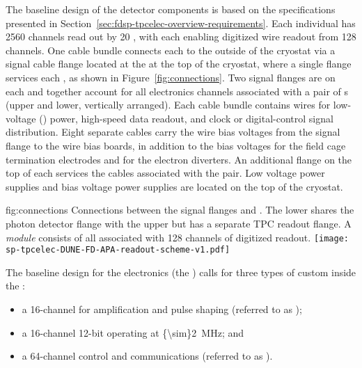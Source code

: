 The baseline design of the  detector components is
based on the specifications %
presented in%
Section~\ref{sec:fdsp-tpcelec-overview-requirements}. 
Each individual  has \num{2560} channels read out by \num{20} 
, with each  enabling digitized wire readout 
from \num{128} channels. One cable bundle connects each  to
the outside of the cryostat via a  signal cable flange located 
at the  \fdth at the top of the cryostat, where a single flange 
services each , as shown in Figure~\ref{fig:connections}. 
Two  signal flanges are on each \fdth and together account for 
all electronics channels associated with a pair of s (upper 
and lower, vertically arranged). Each cable bundle contains wires for 
low-voltage () power, high-speed data readout, and clock or 
digital-control signal distribution. Eight separate cables carry the 
 wire bias voltages from the signal flange to the  
wire bias boards, in addition to the bias voltages for the field cage 
termination electrodes and for the electron diverters. An additional 
flange on the top of each \fdth services the  cables associated 
with the  pair. Low voltage power supplies and bias voltage
power supplies are located on the top of the cryostat. 

\begin{dunefigure}
{fig:connections}
{Connections between the signal flanges and . The lower 
 shares the photon detector flange with the 
upper  but has a separate TPC readout flange. 
A \textit{ module} consists of all  
associated with \num{128} channels of digitized readout.}
\texttt{[image: sp-tpcelec-DUNE-FD-APA-readout-scheme-v1.pdf]}
\end{dunefigure}

The baseline design for the   electronics (the ) calls for three 
types of custom  inside  the :
\begin{itemize}
\item{a \num{16}-channel   for amplification 
and pulse shaping (referred to as );}
\item{a \num{16}-channel \num{12}-bit   
operating at \SI{{\sim}2}{MHz}; and}
\item{a \num{64}-channel control and communications  
(referred to as ).}
\end{itemize}

